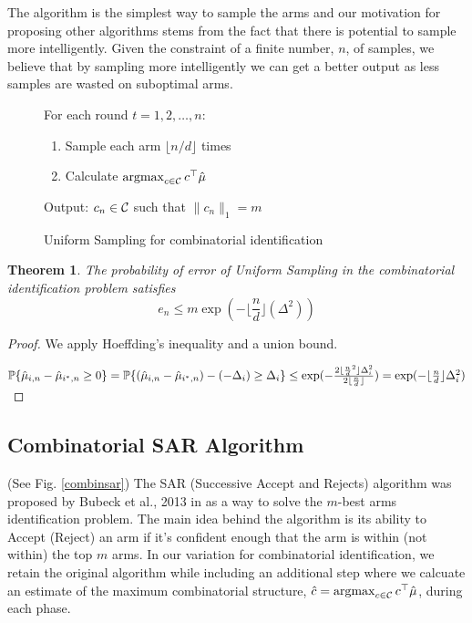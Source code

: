 \documentclass[11.75pt,oneside]{amsart}
\newtheorem{thm}{Theorem}[section]
\begin{document}
The algorithm is the simplest way to sample the arms and our motivation for proposing other algorithms stems from the fact that there is potential to sample more intelligently. Given the constraint of a finite number, $n$, of samples, we believe that by sampling more intelligently we can get a better output as less samples are wasted on suboptimal arms.


\begin{figure}[ht]
\raggedright
For each round $t=1,2, \hdots, n$: \\
\vspace{5pt}
\begin{enumerate}
\item{Sample each arm $\lfloor n/d \rfloor$ times}
\vspace{5pt}
\item{Calculate $\argmax_{c \in \cC} c^{\top} \hat{\mu}$}
\end{enumerate}
\vspace{5pt}
Output: $c_n \in \cC$ such that $\|c_n\|_{1} = m$
\caption{\label{unisample} Uniform Sampling for combinatorial identification}
\end{figure}

\begin{thm}
The probability of error of Uniform Sampling in the combinatorial identification problem satisfies\\
$$e_n \le m\exp (-\lfloor \frac{n}{d} \rfloor(\Delta^2))$$
\end{thm}

\begin{proof}
We apply Hoeffding's inequality and a union bound.

$\P\{\hat{\mu}_{i,n} - \hat{\mu}_{i^*,n} \ge 0 \} = \P\{(\hat{\mu}_{i,n} - \hat{\mu}_{i^*,n}) - (-\Delta_i) \ge \Delta_i \} \le \exp (- \frac{2 \lfloor \frac{n}{d}^2 \rfloor \Delta_i^2}{2\lfloor \frac{n}{d} \rfloor}) = \exp (-\lfloor \frac{n}{d} \rfloor \Delta_i^2)$

\end{proof}

\subsection{Combinatorial SAR Algorithm} (See Fig. \ref{combinsar})
The SAR (Successive Accept and Rejects) algorithm was proposed by Bubeck et al., 2013 in \cite{BWV13} as a way to solve the $m$-best arms identification problem. The main idea behind the algorithm is its ability to Accept (Reject) an arm if it's confident enough that the arm is within (not within) the top $m$ arms. In our variation for combinatorial identification, we retain the original algorithm while including an additional step where we calcuate an estimate of the maximum combinatorial structure, $\hat{c} = \argmax_{c \in \cC} c^{\top} \hat{\mu}$, during each phase.\\
\end{document}

